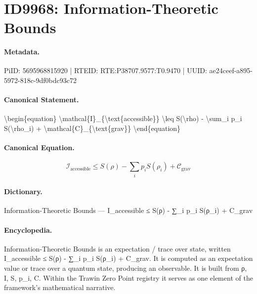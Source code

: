 \section*{ID9968: Information-Theoretic Bounds}
\paragraph{Metadata.}
PiID: 5695968815920 | RTEID: RTE:P38707.9577:T0.9470 | UUID: ae24ceef-a895-5972-818c-9df0bdc93c72

\paragraph{Canonical Statement.}
\textbackslash{}begin\{equation\} \textbackslash{}mathcal\{I\}\_\{\textbackslash{}text\{accessible\}\} \textbackslash{}leq S(\textbackslash{}rho) - \textbackslash{}sum\_i p\_i S(\textbackslash{}rho\_i) + \textbackslash{}mathcal\{C\}\_\{\textbackslash{}text\{grav\}\} \textbackslash{}end\{equation\}

\paragraph{Canonical Equation.}
\[
\mathcal{I}_{\text{accessible}} \leq S(\rho) - \sum_i p_i S(\rho_i) + \mathcal{C}_{\text{grav}}
\]

\paragraph{Dictionary.}
Information-Theoretic Bounds — I\_accessible ≤ S(ρ) - ∑\_i p\_i S(ρ\_i) + C\_grav

\paragraph{Encyclopedia.}
Information-Theoretic Bounds is an expectation / trace over state, written I\_accessible ≤ S(ρ) - ∑\_i p\_i S(ρ\_i) + C\_grav. It is computed as an expectation value or trace over a quantum state, producing an observable. It is built from ρ, I, S, p\_i, C. Within the Trawin Zero Point registry it serves as one element of the framework's mathematical narrative.
